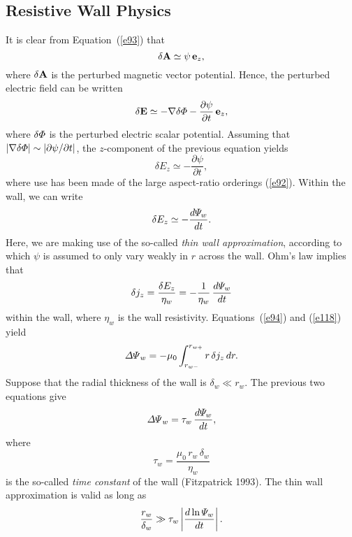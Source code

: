 \documentclass[notitlepage,12pt]{article}
\begin{document}
{\subsection{Resistive Wall Physics}
It is clear from Equation~(\ref{e93}) that
\begin{equation}
\delta {\bf A} \simeq \psi\,{\bf e}_z,
\end{equation}
where $\delta {\bf A}$ is the perturbed magnetic vector potential. 
Hence, the perturbed electric field can be written
\begin{equation}
\delta {\bf E} \simeq -\nabla\delta{\mit\Phi} - \frac{\partial\psi}{\partial t}\,{\bf e}_z,
\end{equation}
where $\delta{\mit\Phi}$ is the perturbed electric scalar potential. 
Assuming that $|\nabla\delta{\mit\Phi}|\sim |\partial\psi/\partial t|$, the $z$-component of the previous
equation yields
\begin{equation}
\delta E_z\simeq -\frac{\partial\psi}{\partial t},
\end{equation}
where use has been made of the large aspect-ratio orderings (\ref{e92}). Within the wall, we
can write
\begin{equation}
\delta E_z \simeq -\frac{d{\mit\Psi}_w}{dt}.
\end{equation}
Here, we are making use of the so-called {\em thin wall approximation}, according to which $\psi$ is assumed to only vary weakly in $r$ across
the wall. Ohm's law implies that
\begin{equation}
\delta j_z = \frac{\delta E_z}{\eta_w} = -\frac{1}{\eta_w}\,\frac{d{\mit\Psi}_w}{dt}
\end{equation}
within the wall, where $\eta_w$ is the wall resistivity. Equations~(\ref{e94}) and (\ref{e118}) yield
\begin{equation}\label{e132}
{\mit\Delta\Psi}_w = -\mu_0\int_{r_{w-}}^{r_{w+}}r\,\delta j_z\,dr.
\end{equation}
Suppose that the radial thickness of the wall is $\delta_w\ll r_w$. The previous two equations give
\begin{equation}\label{e133}
{\mit\Delta\Psi}_w = \tau_w\,\frac{d{\mit\Psi}_w}{dt},
\end{equation}
where
\begin{equation}
\tau_w = \frac{\mu_0\,r_w\,\delta_w}{\eta_w}
\end{equation}
is the so-called {\em time constant}\/ of the wall (Fitzpatrick 1993). The thin wall approximation is
valid as long as
\begin{equation}
\frac{r_w}{\delta_w}\gg \tau_w\left|\frac{d\ln{\mit\Psi}_w}{dt}\right|.
\end{equation}

}
\end{document}
